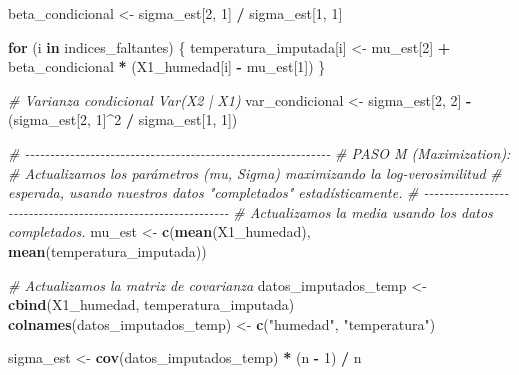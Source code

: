 \documentclass[
]{article}
\newenvironment{Shaded}{\begin{snugshade}}{\end{snugshade}}
\newcommand{\CommentTok}[1]{\textcolor[rgb]{0.56,0.35,0.01}{\textit{#1}}}
\newcommand{\ControlFlowTok}[1]{\textcolor[rgb]{0.13,0.29,0.53}{\textbf{#1}}}
\newcommand{\DecValTok}[1]{\textcolor[rgb]{0.00,0.00,0.81}{#1}}
\newcommand{\FunctionTok}[1]{\textcolor[rgb]{0.13,0.29,0.53}{\textbf{#1}}}
\newcommand{\NormalTok}[1]{#1}
\newcommand{\OtherTok}[1]{\textcolor[rgb]{0.56,0.35,0.01}{#1}}
\newcommand{\SpecialCharTok}[1]{\textcolor[rgb]{0.81,0.36,0.00}{\textbf{#1}}}
\newcommand{\StringTok}[1]{\textcolor[rgb]{0.31,0.60,0.02}{#1}}
\begin{document}
\begin{Shaded}
\begin{Highlighting}[]
\NormalTok{  beta\_condicional }\OtherTok{\textless{}{-}}\NormalTok{ sigma\_est[}\DecValTok{2}\NormalTok{, }\DecValTok{1}\NormalTok{] }\SpecialCharTok{/}\NormalTok{ sigma\_est[}\DecValTok{1}\NormalTok{, }\DecValTok{1}\NormalTok{]}
  
  \ControlFlowTok{for}\NormalTok{ (i }\ControlFlowTok{in}\NormalTok{ indices\_faltantes) \{}
\NormalTok{    temperatura\_imputada[i] }\OtherTok{\textless{}{-}}\NormalTok{ mu\_est[}\DecValTok{2}\NormalTok{] }\SpecialCharTok{+}\NormalTok{ beta\_condicional }\SpecialCharTok{*}\NormalTok{ (X1\_humedad[i] }\SpecialCharTok{{-}}\NormalTok{ mu\_est[}\DecValTok{1}\NormalTok{])}
\NormalTok{  \}}
  
  \CommentTok{\# Varianza condicional Var(X2 | X1)}
\NormalTok{  var\_condicional }\OtherTok{\textless{}{-}}\NormalTok{ sigma\_est[}\DecValTok{2}\NormalTok{, }\DecValTok{2}\NormalTok{] }\SpecialCharTok{{-}}\NormalTok{ (sigma\_est[}\DecValTok{2}\NormalTok{, }\DecValTok{1}\NormalTok{]}\SpecialCharTok{\^{}}\DecValTok{2} \SpecialCharTok{/}\NormalTok{ sigma\_est[}\DecValTok{1}\NormalTok{, }\DecValTok{1}\NormalTok{])}
  
  \CommentTok{\# {-}{-}{-}{-}{-}{-}{-}{-}{-}{-}{-}{-}{-}{-}{-}{-}{-}{-}{-}{-}{-}{-}{-}{-}{-}{-}{-}{-}{-}{-}{-}{-}{-}{-}{-}{-}{-}{-}{-}{-}{-}{-}{-}{-}{-}{-}{-}{-}{-}{-}{-}{-}{-}{-}{-}{-}{-}{-}{-}{-}{-} }
  \CommentTok{\# PASO M (Maximization):}
  \CommentTok{\# Actualizamos los parámetros (mu, Sigma) maximizando la log{-}verosimilitud}
  \CommentTok{\# esperada, usando nuestros datos "completados" estadísticamente.  }
  \CommentTok{\# {-}{-}{-}{-}{-}{-}{-}{-}{-}{-}{-}{-}{-}{-}{-}{-}{-}{-}{-}{-}{-}{-}{-}{-}{-}{-}{-}{-}{-}{-}{-}{-}{-}{-}{-}{-}{-}{-}{-}{-}{-}{-}{-}{-}{-}{-}{-}{-}{-}{-}{-}{-}{-}{-}{-}{-}{-}{-}{-}{-}{-}}
  \CommentTok{\# Actualizamos la media usando los datos completados.}
\NormalTok{  mu\_est }\OtherTok{\textless{}{-}} \FunctionTok{c}\NormalTok{(}\FunctionTok{mean}\NormalTok{(X1\_humedad), }\FunctionTok{mean}\NormalTok{(temperatura\_imputada))}
  
  \CommentTok{\# Actualizamos la matriz de covarianza }
\NormalTok{  datos\_imputados\_temp }\OtherTok{\textless{}{-}} \FunctionTok{cbind}\NormalTok{(X1\_humedad, temperatura\_imputada)}
  \FunctionTok{colnames}\NormalTok{(datos\_imputados\_temp) }\OtherTok{\textless{}{-}} \FunctionTok{c}\NormalTok{(}\StringTok{"humedad"}\NormalTok{, }\StringTok{"temperatura"}\NormalTok{)}
  
\NormalTok{  sigma\_est }\OtherTok{\textless{}{-}} \FunctionTok{cov}\NormalTok{(datos\_imputados\_temp) }\SpecialCharTok{*}\NormalTok{ (n }\SpecialCharTok{{-}} \DecValTok{1}\NormalTok{) }\SpecialCharTok{/}\NormalTok{ n}
  

\end{Highlighting}
\end{Shaded}
\end{document}
